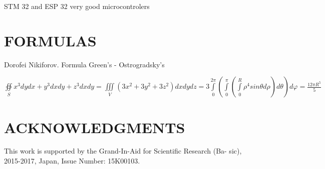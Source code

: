 \documentclass{aip-cp}
\begin{document}
STM 32 and ESP 32 very good microcontrolers


\section{FORMULAS}


Dorofei Nikiforov. Formula Green's - Ostrogradsky's 

\begin{math}
\oiint \limits_S x^3 dydx + y^3 dxdy + z^3 dxdy = \iiint \limits_V (3x^2 + 3y^2 + 3z^2 )dxdydz = 
3\int \limits_0^{2\pi}(\int \limits_0^\pi (\int \limits_0^R \rho^4 sin  \theta  d \rho)d \theta)d  \varphi   = \frac {12 \pi R^5}{5}
\end{math}




\section{ACKNOWLEDGMENTS}
This work is supported by the Grand-In-Aid for Scientific Research (Ba- sic), 2015-2017, Japan, Issue Number: 15K00103.


\nocite{*}
%
%
\end{document}

